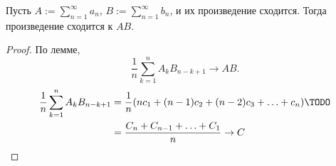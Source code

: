 \begin{theorem} \thmslashn

    Пусть $A := \sum\limits_{n=1}^{\infty} a_{n}$, $B := \sum\limits_{n=1}^{\infty} b_{n}$, и их произведение сходится. Тогда произведение сходится к $AB$.

    \begin{proof} \thmslashn
    
       По лемме, 
       \[ \frac{1}{n} \sum\limits_{k=1}^{n} A_{k}B_{n-k+1} \to AB .\] 
       \begin{equation*}
           \begin{split}
               \frac{1}{n} \sum\limits_{k=1}^{n} A_{k}B_{n-k+1}
               &= \frac{1}{n}(nc_1 + (n-1)c_2+(n-2)c_3 + \ldots + c_{n})\TODO \\ 
               &= \frac{C_{n} + C_{n-1} + \ldots + C_1}{n} \to C
           \end{split}
       \end{equation*}
    \end{proof}
\end{theorem}
